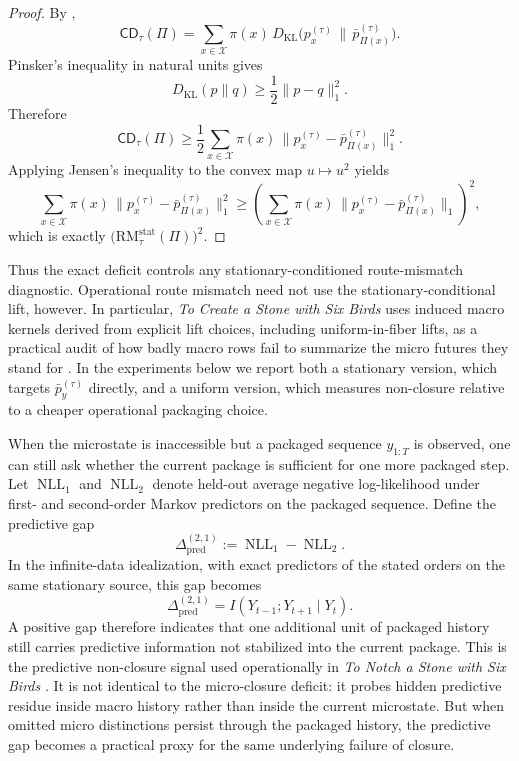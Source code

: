 \documentclass[11pt]{article}
\numberwithin{equation}{section}
\begin{document}
\begin{proof}
By ,
\[
\mathsf{CD}_\tau(\Pi)
=
\sum_{x \in \mathcal{X}}
\pi(x)\,
D_{\mathrm{KL}}\!\bigl(
p_x^{(\tau)}
\,\|\,
\bar p_{\Pi(x)}^{(\tau)}
\bigr).
\]
Pinsker's inequality in natural units gives \citep{cover2006elementsofinformationtheory}
\[
D_{\mathrm{KL}}(p\|q)
\ge
\frac{1}{2}\|p-q\|_1^2.
\]
Therefore
\[
\mathsf{CD}_\tau(\Pi)
\ge
\frac{1}{2}
\sum_{x \in \mathcal{X}}
\pi(x)\,
\bigl\|
p_x^{(\tau)}-\bar p_{\Pi(x)}^{(\tau)}
\bigr\|_1^2.
\]
Applying Jensen's inequality to the convex map $u \mapsto u^2$ yields
\[
\sum_{x \in \mathcal{X}}
\pi(x)\,
\bigl\|
p_x^{(\tau)}-\bar p_{\Pi(x)}^{(\tau)}
\bigr\|_1^2
\ge
\left(
\sum_{x \in \mathcal{X}}
\pi(x)\,
\bigl\|
p_x^{(\tau)}-\bar p_{\Pi(x)}^{(\tau)}
\bigr\|_1
\right)^2,
\]
which is exactly $\bigl(\mathrm{RM}_\tau^{\mathrm{stat}}(\Pi)\bigr)^2$.
\end{proof}

Thus the exact deficit controls any stationary-conditioned route-mismatch diagnostic. Operational route mismatch need not use the stationary-conditional lift, however. In particular, \emph{To Create a Stone with Six Birds} uses induced macro kernels derived from explicit lift choices, including uniform-in-fiber lifts, as a practical audit of how badly macro rows fail to summarize the micro futures they stand for \citep{tsiokos2026pica}. In the experiments below we report both a stationary version, which targets $\bar p_y^{(\tau)}$ directly, and a uniform version, which measures non-closure relative to a cheaper operational packaging choice.

When the microstate is inaccessible but a packaged sequence $y_{1:T}$ is observed, one can still ask whether the current package is sufficient for one more packaged step. Let $\operatorname{NLL}_1$ and $\operatorname{NLL}_2$ denote held-out average negative log-likelihood under first- and second-order Markov predictors on the packaged sequence. Define the predictive gap
\begin{equation}
\Delta_{\mathrm{pred}}^{(2,1)}
:=
\operatorname{NLL}_1-\operatorname{NLL}_2.
\label{eq:pred-gap}
\end{equation}
In the infinite-data idealization, with exact predictors of the stated orders on the same stationary source, this gap becomes
\[
\Delta_{\mathrm{pred}}^{(2,1)}
=
I(Y_{t-1};Y_{t+1}\mid Y_t).
\]
A positive gap therefore indicates that one additional unit of packaged history still carries predictive information not stabilized into the current package. This is the predictive non-closure signal used operationally in \emph{To Notch a Stone with Six Birds} \citep{tsiokos2026notch}. It is not identical to the micro-closure deficit: it probes hidden predictive residue inside macro history rather than inside the current microstate. But when omitted micro distinctions persist through the packaged history, the predictive gap becomes a practical proxy for the same underlying failure of closure.
\end{document}
